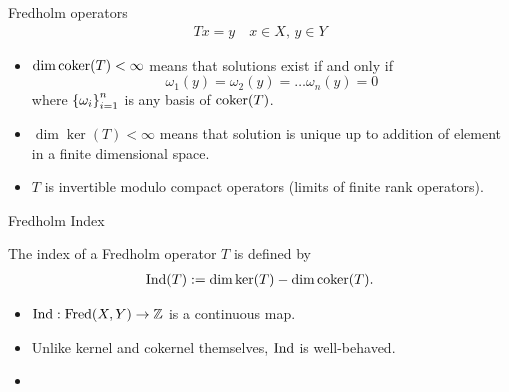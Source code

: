 \documentclass{beamer}
\begin{document}
\begin{frame}{Fredholm operators}
\begin{align*}
T x = y \quad x \in X, \, y \in Y
\end{align*}
\begin{itemize}
    \item $\dim {\mathrm{coker}}(T) < \infty $ means that solutions exist if and only if 
    $$\omega_1(y) = \omega_2(y) = \dots \omega_n(y) = 0$$ 
    where $\left\{\omega_i\right\}_{i = 1}^n$ is any basis of ${\mathrm{coker}}(T)$. 
    
    \item $\dim \ker(T) < \infty$ means that solution is unique up to addition of element in a finite dimensional space. 
    
    \item $T$ is invertible modulo compact operators (limits of finite rank operators). 
\end{itemize}

\end{frame}


\begin{frame}{Fredholm Index}
\begin{definition}
    The index of a Fredholm operator $T$ is defined by
    \begin{align*}
    {\mathrm{Ind}}(T) := \dim {\mathrm{ker}}(T) - \dim {\mathrm{coker}}(T). 
    \end{align*}
\end{definition}
\begin{itemize}
    \item ${\mathrm{Ind}} : \mathrm{Fred}(X, Y) \to {\ensuremath {\mathbb Z}}$ is a continuous map. 
    \item Unlike kernel and cokernel themselves, ${\mathrm{Ind}}$ is well-behaved. 
    \item {} 
\end{itemize}


\end{frame}
\end{document}
